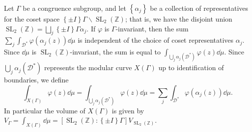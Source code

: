 \documentclass[10pt,leqno,twoside]{article}
\theoremstyle{plain}
\theoremstyle{definition}
\numberwithin{equation}{section}
\numberwithin{lem}{section}
\newcommand{\cbr}[1]{\left\{#1\right\}}
\DeclareMathOperator{\SL}{SL}
\newcommand{\slz}{\SL_2(\mathbb{Z})}
\begin{document}
Let $\varGamma$ be a congruence subgroup, and let $\cbr{\alpha_j}$ be a collection of representatives for the coset space $\cbr{\pm I}\varGamma\backslash\slz$; that is, we have the disjoint union $\slz = \bigsqcup_j \cbr{\pm I}\varGamma \alpha_j$. If $\varphi$ is $\varGamma$-invariant, then the sum $\sum_j\int_{\mathcal D^\ast}\varphi(\alpha_j(z))\dd\mu$ is independent of the choice of coset representatives $\alpha_j$. Since $\dd\mu$ is $\slz$-invariant, the sum is equal to $\int_{\bigcup_j \alpha_j(\mathcal D^\ast)}\varphi(z)\dd\mu$. Since $\bigcup_j\alpha_j(\mathcal D^\ast)$ represents the modular curve $X(\varGamma)$ up to identification of boundaries, we define 
\[\int_{X(\varGamma)}\varphi(z)\dd\mu = \int_{\bigcup_j\alpha_j(\mathcal D^\ast)}\varphi(z)\dd\mu = \sum_j\int_{\mathcal D^\ast}\varphi(\alpha_j(z))\dd\mu.\] In particular the volume of $X(\varGamma)$ is given by $V_\varGamma = \int_{X(\varGamma)}\dd\mu = [\slz : \cbr{\pm I}\varGamma]V_{\slz}$.
\end{document}
